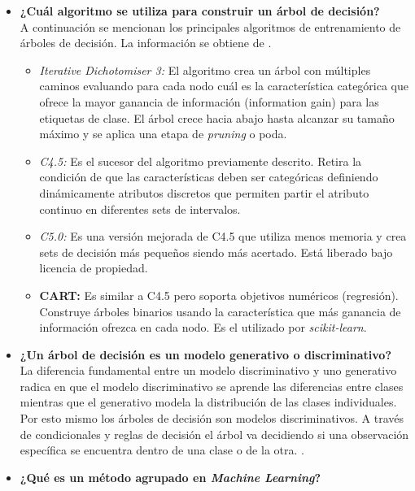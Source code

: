 \begin{itemize}
    \item \textbf{¿Cuál algoritmo se utiliza para construir un árbol de decisión?}\\
    
    A continuación se mencionan los principales algoritmos de entrenamiento de árboles de decisión. La información se obtiene de \cite{Sklearn-DT}.
    \begin{itemize}
        \item \textit{Iterative Dichotomiser 3:} El algoritmo crea un árbol con múltiples caminos evaluando para cada nodo cuál es la característica categórica que ofrece la mayor ganancia de información (information gain) para las etiquetas de clase. El árbol crece hacia abajo hasta alcanzar su tamaño máximo y se aplica una etapa de \textit{pruning} o poda. 
        \item \textit{C4.5:} Es el sucesor del algoritmo previamente descrito. Retira la condición de que las características deben ser categóricas definiendo dinámicamente atributos discretos que permiten partir el atributo continuo en diferentes sets de intervalos.
        \item \textit{C5.0:} Es una versión mejorada de C4.5 que utiliza menos memoria y crea sets de decisión más pequeños siendo más acertado. Está liberado bajo licencia de propiedad.
        \item \textbf{\textbf{CART:}} Es similar a C4.5 pero soporta objetivos numéricos (regresión). Construye árboles binarios usando la característica que más ganancia de información ofrezca en cada nodo. Es el utilizado por \textit{scikit-learn}.
    \end{itemize}
    \item \textbf{¿Un árbol de decisión es un modelo generativo o discriminativo?}\\
    
    La diferencia fundamental entre un modelo discriminativo y uno generativo radica en que el modelo discriminativo se aprende las diferencias entre clases mientras que el generativo modela la distribución de las clases individuales. Por esto mismo los árboles de decisión son modelos discriminativos. A través de condicionales y reglas de decisión el árbol va decidiendo si una observación específica se encuentra dentro de una clase o de la otra. \cite{DvsG}.
    
    \item \textbf{¿Qué es un método agrupado en \textit{Machine Learning}?}\\
    

\end{itemize}
